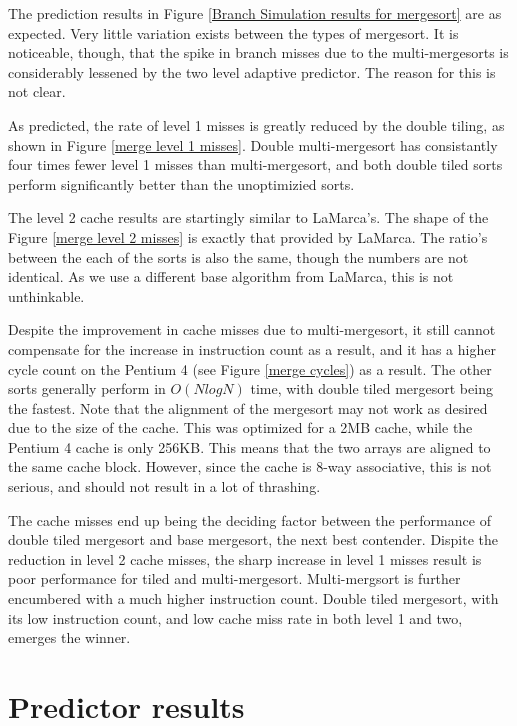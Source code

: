 The prediction results in Figure \ref{Branch Simulation results for mergesort}
are as expected. Very little variation exists between the types of mergesort. It
is noticeable, though, that the spike in branch misses due to the
multi-mergesorts is considerably lessened by the two level adaptive predictor.
The reason for this is not clear.

As predicted, the rate of level 1 misses is greatly reduced by the double
tiling, as shown in Figure \ref{merge level 1 misses}. Double multi-mergesort
has consistantly four times fewer level 1 misses than multi-mergesort, and both
double tiled sorts perform significantly better than the unoptimizied sorts.

The level 2 cache results are startingly similar to LaMarca's. The shape of the
Figure \ref{merge level 2 misses} is exactly that provided by LaMarca. The
ratio's between the each of the sorts is also the same, though the numbers are
not identical. As we use a different base algorithm from LaMarca, this is not
unthinkable.

Despite the improvement in cache misses due to multi-mergesort, it still cannot
compensate for the increase in instruction count as a result, and it has a higher
cycle count on the Pentium 4 (see Figure \ref{merge cycles}) as a result. The
other sorts generally perform in $O(NlogN)$ time, with double tiled mergesort
being the fastest. Note that the alignment of the mergesort may not work as
desired due to the size of the cache. This was optimized for a 2MB cache, while
the Pentium 4 cache is only 256KB. This means that the two arrays are aligned to
the same cache block. However, since the cache is 8-way associative, this is not
serious, and should not result in a lot of thrashing.

The cache misses end up being the deciding factor between the performance of
double tiled mergesort and base mergesort, the next best contender. Dispite the
reduction in level 2 cache misses, the sharp increase in level 1 misses result
is poor performance for tiled and multi-mergesort. Multi-mergsort is further
encumbered with a much higher instruction count. Double tiled mergesort, with
its low instruction count, and low cache miss rate in both level 1 and two,
emerges the winner.

\section{Predictor results}



